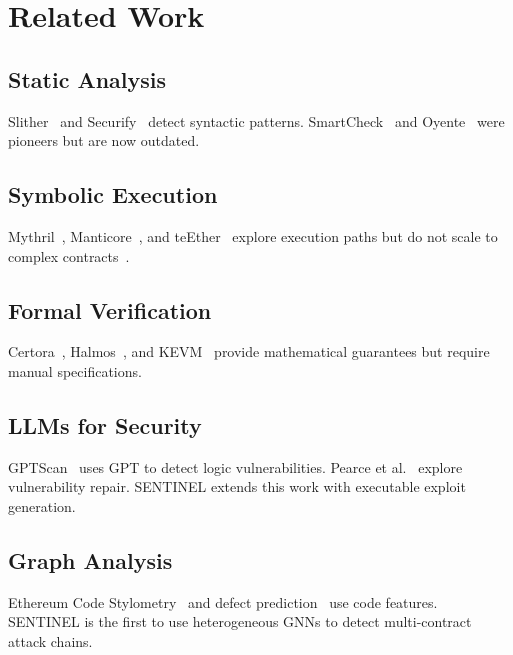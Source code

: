 \documentclass[11pt]{article}
\theoremstyle{definition}
\theoremstyle{plain}
\theoremstyle{remark}
\begin{document}
\section{Related Work}
\label{sec:related}

\subsection{Static Analysis}

Slither~\cite{feist2019slither} and Securify~\cite{tsankov2018securify} detect syntactic patterns. SmartCheck~\cite{tikhomirov2018smartcheck} and Oyente~\cite{luu2016making} were pioneers but are now outdated.

\subsection{Symbolic Execution}

Mythril~\cite{mueller2018mythril}, Manticore~\cite{mossberg2019manticore}, and teEther~\cite{krupp2018teether} explore execution paths but do not scale to complex contracts~\cite{durieux2020empirical}.

\subsection{Formal Verification}

Certora~\cite{certora2023}, Halmos~\cite{halmos2023}, and KEVM~\cite{hildenbrandt2018kevm} provide mathematical guarantees but require manual specifications.

\subsection{LLMs for Security}

GPTScan~\cite{sun2023gptscan} uses GPT to detect logic vulnerabilities. Pearce et al.~\cite{pearce2023examining} explore vulnerability repair. SENTINEL extends this work with executable exploit generation.

\subsection{Graph Analysis}

Ethereum Code Stylometry~\cite{chen2020survey} and defect prediction~\cite{liu2021combining} use code features. SENTINEL is the first to use heterogeneous GNNs to detect multi-contract attack chains.
\end{document}
